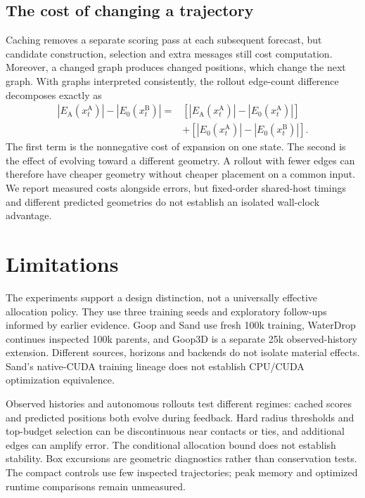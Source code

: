 \subsection{The cost of changing a trajectory}
Caching removes a separate scoring pass at each subsequent forecast, but candidate construction, selection and extra messages still cost computation. Moreover, a changed graph produces changed positions, which change the next graph. With graphs interpreted consistently, the rollout edge-count difference decomposes exactly as
\begin{align}
 |E_{\mathrm A}(x_t^{\mathrm A})|-|E_0(x_t^{\mathrm B})|
 ={}&[|E_{\mathrm A}(x_t^{\mathrm A})|-|E_0(x_t^{\mathrm A})|]\nonumber\\
 &+[|E_0(x_t^{\mathrm A})|-|E_0(x_t^{\mathrm B})|].
 \label{eq:decomposition}
\end{align}
The first term is the nonnegative cost of expansion on one state. The second is the effect of evolving toward a different geometry. A rollout with fewer edges can therefore have cheaper geometry without cheaper placement on a common input. We report measured costs alongside errors, but fixed-order shared-host timings and different predicted geometries do not establish an isolated wall-clock advantage.

\section{Limitations}
The experiments support a design distinction, not a universally effective allocation policy. They use three training seeds and exploratory follow-ups informed by earlier evidence. Goop and Sand use fresh 100k training, WaterDrop continues inspected 100k parents, and Goop3D is a separate 25k observed-history extension. Different sources, horizons and backends do not isolate material effects. Sand's native-CUDA training lineage does not establish CPU/CUDA optimization equivalence.

Observed histories and autonomous rollouts test different regimes: cached scores and predicted positions both evolve during feedback. Hard radius thresholds and top-budget selection can be discontinuous near contacts or ties, and additional edges can amplify error. The conditional allocation bound does not establish stability. Box excursions are geometric diagnostics rather than conservation tests. The compact controls use few inspected trajectories; peak memory and optimized runtime comparisons remain unmeasured.
